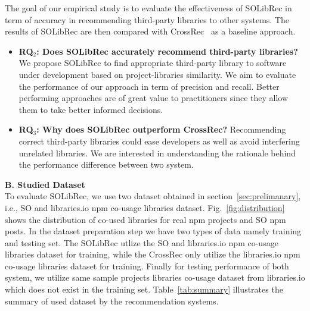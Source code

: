 \documentclass[paper]{ieice}
\newcommand{\RqTwo}{\textbf{RQ$_2$: Does SOLibRec accurately recommend third-party libraries?}}
\newcommand{\RqThree}{\textbf{RQ$_3$: Why does SOLibRec outperform CrossRec?}}
\begin{document}
The goal of our empirical study is to evaluate the effectiveness of SOLibRec in term of accuracy in recommending third-party libraries to other systems. The results of SOLibRec are then compared with CrossRec~\cite{nguyen2020crossrec} as a baseline approach.
\begin{itemize}
        
        \item{\RqTwo}
        We propose SOLibRec to find appropriate third-party library to software under development based on project-libraries similarity. We aim to evaluate the performance of our approach in term of precision and recall. Better performing approaches are of great value to practitioners since they allow them to take better informed decisions. 
         
        \item{\RqThree}
        Recommending correct third-party libraries could ease developers as well as avoid interfering unrelated libraries. We are interested in understanding the rationale behind the performance difference between two system.
        
    \end{itemize}

\noindent\textbf{B. Studied Dataset}\\

To evaluate SOLibRec, we use two dataset obtained in section~\ref{sec:prelimanary}, i.e., SO and libraries.io npm co-usage libraries dataset. Fig.~\ref{fig:distribution} shows the distribution of co-used libraries for real npm projects and SO npm posts.
In the dataset preparation step we have two types of data namely training and testing set. The SOLibRec utlize the SO and libraries.io npm co-usage libraries dataset for training, while the CrossRec only utilize the libraries.io npm co-usage libraries dataset for training. Finally for testing performance of both system, we utilize same sample projects libraries co-usage dataset from libraries.io which does not exist in the training set. Table~\ref{tab:summary} illustrates the summary of used dataset by the recommendation systems.\\
\end{document}
